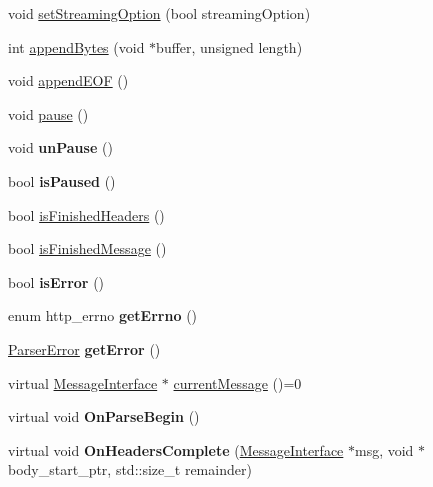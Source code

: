 \begin{DoxyCompactItemize}
\item 
void \hyperlink{class_parser_ac6eba4f77cd89023b2940e46ed449df3}{set\+Streaming\+Option} (bool streaming\+Option)
\item 
int \hyperlink{class_parser_a72709d4b733b6ad615669726f77ca52a}{append\+Bytes} (void $\ast$buffer, unsigned length)
\item 
void \hyperlink{class_parser_ac569347a4bdd7a04ede0c0a4c6efe215}{append\+E\+OF} ()
\item 
void \hyperlink{class_parser_a534e9326567306cdf50a7bb980292c37}{pause} ()
\item 
\mbox{\label{class_parser_a4872223c0f89b4f6f01eb2af4ab61849}} 
void {\bfseries un\+Pause} ()
\item 
\mbox{\label{class_parser_af5678187dc7ea87e789b137b65719775}} 
bool {\bfseries is\+Paused} ()
\item 
bool \hyperlink{class_parser_aae7788cc722b8455e691a14dded5d726}{is\+Finished\+Headers} ()
\item 
bool \hyperlink{class_parser_ad9d6c98af922409a78ff65083b1983e3}{is\+Finished\+Message} ()
\item 
\mbox{\label{class_parser_a22a7239a764b6f9bd34c044ce1f6bbe2}} 
bool {\bfseries is\+Error} ()
\item 
\mbox{\label{class_parser_ab1701b88c2232d03e1dfc77a7e4b1563}} 
enum http\+\_\+errno {\bfseries get\+Errno} ()
\item 
\mbox{\label{class_parser_a293570156f767bf0050fc7889b65f356}} 
\hyperlink{struct_parser_error}{Parser\+Error} {\bfseries get\+Error} ()
\item 
virtual \hyperlink{class_message_interface}{Message\+Interface} $\ast$ \hyperlink{class_parser_a7b3c3ac1cf86a5f9fdda1ecf06dcd4dc}{current\+Message} ()=0
\item 
\mbox{\label{class_parser_a543fbd3286c6ca53ed364f4be75473ff}} 
virtual void {\bfseries On\+Parse\+Begin} ()
\item 
\mbox{\label{class_parser_ae1c3a1139dbf03130e4a8c6232bc0f1c}} 
virtual void {\bfseries On\+Headers\+Complete} (\hyperlink{class_message_interface}{Message\+Interface} $\ast$msg, void $\ast$body\+\_\+start\+\_\+ptr, std\+::size\+\_\+t remainder)

\end{DoxyCompactItemize}
